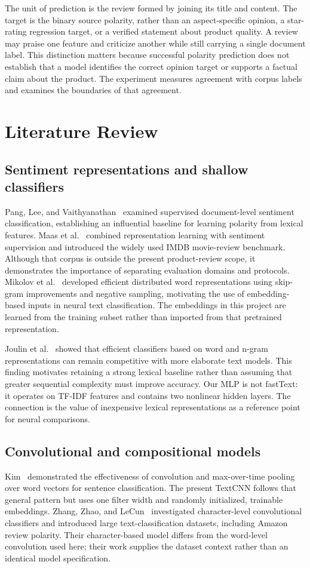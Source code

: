 The unit of prediction is the review formed by joining its title and content. The target is the binary source polarity, rather than an aspect-specific opinion, a star-rating regression target, or a verified statement about product quality. A review may praise one feature and criticize another while still carrying a single document label. This distinction matters because successful polarity prediction does not establish that a model identifies the correct opinion target or supports a factual claim about the product. The experiment measures agreement with corpus labels and examines the boundaries of that agreement.


\section{Literature Review}
\subsection{Sentiment representations and shallow classifiers}
Pang, Lee, and Vaithyanathan~\cite{pang2002} examined supervised document-level sentiment classification, establishing an influential baseline for learning polarity from lexical features. Maas et al.~\cite{maas2011} combined representation learning with sentiment supervision and introduced the widely used IMDB movie-review benchmark. Although that corpus is outside the present product-review scope, it demonstrates the importance of separating evaluation domains and protocols. Mikolov et al.~\cite{mikolov2013} developed efficient distributed word representations using skip-gram improvements and negative sampling, motivating the use of embedding-based inputs in neural text classification. The embeddings in this project are learned from the training subset rather than imported from that pretrained representation.

Joulin et al.~\cite{joulin2017} showed that efficient classifiers based on word and n-gram representations can remain competitive with more elaborate text models. This finding motivates retaining a strong lexical baseline rather than assuming that greater sequential complexity must improve accuracy. Our MLP is not fastText: it operates on TF-IDF features and contains two nonlinear hidden layers. The connection is the value of inexpensive lexical representations as a reference point for neural comparisons.

\subsection{Convolutional and compositional models}
Kim~\cite{kim2014} demonstrated the effectiveness of convolution and max-over-time pooling over word vectors for sentence classification. The present TextCNN follows that general pattern but uses one filter width and randomly initialized, trainable embeddings. Zhang, Zhao, and LeCun~\cite{zhang2015} investigated character-level convolutional classifiers and introduced large text-classification datasets, including Amazon review polarity. Their character-based model differs from the word-level convolution used here; their work supplies the dataset context rather than an identical model specification.

